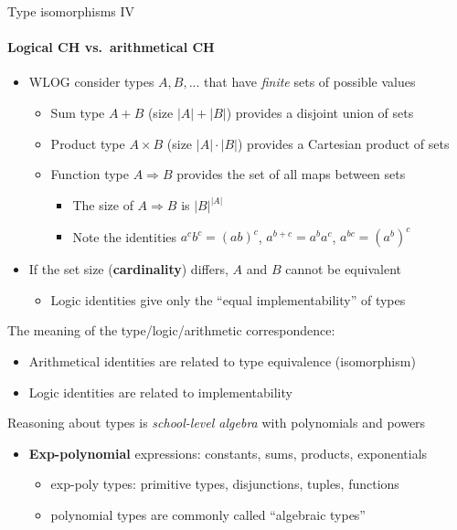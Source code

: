 \documentclass[english]{beamer}
\begin{document}
\begin{frame}{Type isomorphisms IV}


\framesubtitle{Logical CH vs.\ arithmetical CH}
\begin{itemize}
\item WLOG consider types $A,B,...$ that have \emph{finite} sets of possible
values
\begin{itemize}
\item Sum type $A+B$ (size $\left|A\right|+\left|B\right|$) provides a
disjoint union of sets
\item Product type $A\times B$ (size $\left|A\right|\cdot\left|B\right|$)
provides a Cartesian product of sets
\item Function type $A\Rightarrow B$ provides the set of all maps between
sets
\begin{itemize}
\item The size of $A\Rightarrow B$ is $\left|B\right|^{\left|A\right|}$
\item Note the identities $a^{c}b^{c}=\left(ab\right)^{c}$, $a^{b+c}=a^{b}a^{c}$,
$a^{bc}=\left(a^{b}\right)^{c}$
\end{itemize}
\end{itemize}
\item If the set size (\textbf{cardinality}) differs, $A$ and $B$ cannot
be equivalent 
\begin{itemize}
\item Logic identities give only the ``equal implementability'' of types
\end{itemize}
\end{itemize}
The meaning of the type/logic/arithmetic correspondence:
\begin{itemize}
\item Arithmetical identities are related to type equivalence (isomorphism)
\item Logic identities are related to implementability
\end{itemize}
Reasoning about types is \emph{school-level algebra} with polynomials
and powers
\begin{itemize}
\item \textbf{Exp-polynomial }expressions: constants, sums, products, exponentials
\begin{itemize}
\item exp-poly types: primitive types, disjunctions, tuples, functions
\item polynomial types are commonly called ``algebraic types''
\end{itemize}
\end{itemize}
\end{frame}
\end{document}
